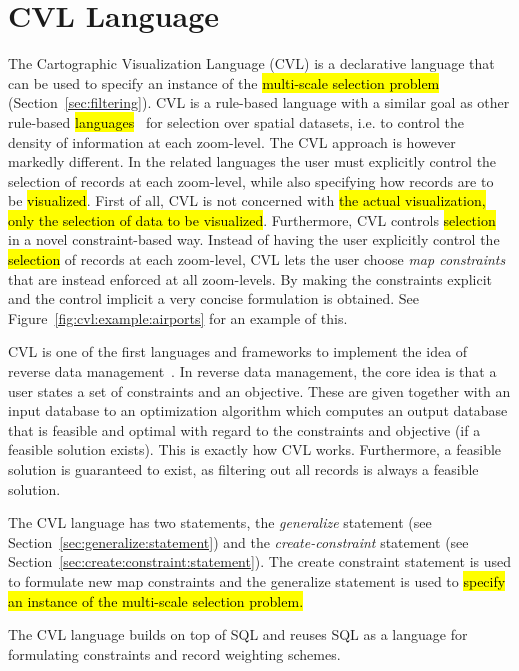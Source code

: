 \section{CVL Language}
\label{sec:cvl:language}
The Cartographic Visualization Language (CVL) is a declarative language that can be used to specify an instance of the \hl{multi-scale selection problem} (Section~\ref{sec:filtering}). CVL is a rule-based language with a similar goal as other rule-based \hl{languages}~\cite{sld,mapnik} for selection over spatial datasets, i.e. to control the density of information at each zoom-level. The CVL approach is however markedly different. In the related languages the user must explicitly control the selection of records at each zoom-level, while also specifying how records are to be \hl{visualized}. First of all, CVL is not concerned with \hl{the actual visualization, only the selection of data to be visualized}. Furthermore, CVL controls \hl{selection} in a novel constraint-based way. Instead of having the user explicitly control the \hl{selection} of records at each zoom-level, CVL lets the user choose \emph{map constraints} that are instead enforced at all zoom-levels. By making the constraints explicit and the control implicit a very concise formulation is obtained. See Figure~\ref{fig:cvl:example:airports} for an example of this.

CVL is one of the first languages and frameworks to implement the idea of reverse data management~\cite{meliou2011reverse}. In reverse data management, the core idea is that a user states a set of constraints and an objective. These are given together with an input database to an optimization algorithm which computes an output database that is feasible and optimal with regard to the constraints and objective (if a feasible solution exists). This is exactly how CVL works. Furthermore, a feasible solution is guaranteed to exist, as filtering out all records is always a feasible solution.

The CVL language has two statements, the \emph{generalize} statement (see Section~\ref{sec:generalize:statement}) and the \emph{create-constraint} statement (see Section~\ref{sec:create:constraint:statement}). The create constraint statement is used to formulate new map constraints and the generalize statement is used to \hl{specify an instance of the multi-scale selection problem.} 

The CVL language builds on top of SQL and reuses SQL as a language for formulating constraints and record weighting schemes.

